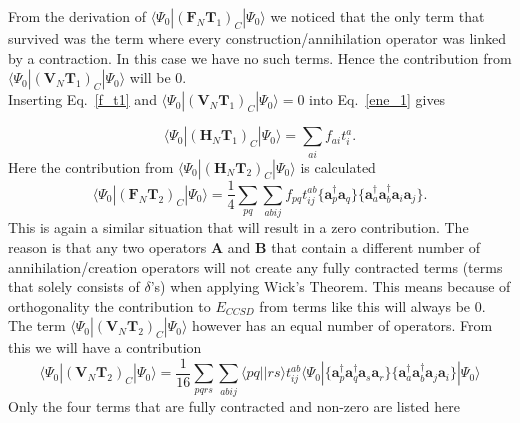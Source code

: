 \documentclass[a4paper,norsk,11pt,twoside]{report}
\begin{document}
From the derivation of $\langle \Psi_0 | (\textbf{F}_N \textbf{T}_1)_C
| \Psi_0 \rangle$ we noticed that the only term that survived was the
term where every construction/annihilation operator was linked by a
contraction. In this case we have no such terms. Hence the
contribution from $\langle \Psi_0 | (\textbf{V}_N \textbf{T}_1)_C |
\Psi_0 \rangle$ will be 0. \\

Inserting Eq.~\eqref{f_t1} and $\langle \Psi_0 | (\textbf{V}_N \textbf{T}_1)_C | \Psi_0 \rangle = 0$ into Eq.~\eqref{ene_1} gives 

\begin{equation}
\langle \Psi_0 | (\textbf{H}_N \textbf{T}_1)_C | \Psi_0 \rangle = \sum_{ai} f_{ai} t_i^a . \label{Energy_Contribution_1}
\end{equation}
Here the contribution from $\langle \Psi_0 | (\textbf{H}_N \textbf{T}_2)_C | \Psi_0 \rangle$ is calculated
\begin{equation}
\langle \Psi_0 | (\textbf{F}_N \textbf{T}_2)_C | \Psi_0 \rangle = \frac{1}{4} \sum_{pq} \sum_{abij} f_{pq} t_{ij}^{ab} \{ \textbf{a}^{\dag}_p \textbf{a}_q \}
\{ \textbf{a}^{\dag}_a \textbf{a}^{\dag}_b \textbf{a}_i \textbf{a}_j \} .
\end{equation}
This is again a similar situation that will result in a zero
contribution. The reason is that any two operators $\textbf{A}$ and
$\textbf{B}$ that contain a different number of annihilation/creation
operators will not create any fully contracted terms (terms that
solely consists of $\delta$'s) when applying Wick's Theorem. This
means because of orthogonality the contribution to $E_{CCSD}$ from
terms like this will always be 0. \\
The term
$\langle \Psi_0 | (\textbf{V}_N \textbf{T}_2)_C | \Psi_0 \rangle$ however has an equal number of operators. From this we will have a contribution
\begin{equation}
\langle \Psi_0 | (\textbf{V}_N \textbf{T}_2)_C | \Psi_0 \rangle = \frac{1}{16} \sum_{pqrs} \sum_{abij} \langle pq||rs \rangle t_{ij}^{ab} \langle \Psi_0|
\{
\textbf{a}^{\dag}_p \textbf{a}^{\dag}_q
\textbf{a}_s \textbf{a}_r \}
\{
\textbf{a}^{\dag}_a \textbf{a}^{\dag}_b
\textbf{a}_j \textbf{a}_i \}
| \Psi_0 \rangle \nonumber
\end{equation}
Only the four terms that are fully contracted and non-zero are listed here
\end{document}
